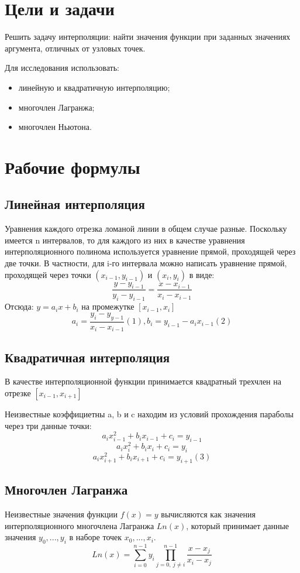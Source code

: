 \documentclass[12pt, a4paper]{article}
\begin{document}


\section*{Цели и задачи}
Решить задачу интерполяции: найти значения функции при заданных значениях
аргумента, отличных от узловых точек.

Для исследования использовать:
\begin{itemize}
  \item линейную и квадратичную интерполяцию;
  \item многочлен Лагранжа;
  \item многочлен Ньютона.
\end{itemize}

\section*{Рабочие формулы}
\subsection*{Линейная интерполяция}
Уравнения каждого отрезка ломаной линии в общем случае разные. Поскольку
имеется n интервалов, то для  каждого из них в качестве  уравнения
интерполяционного полинома используется уравнение прямой, проходящей через
две точки. В частности, для i-го интервала можно написать уравнение прямой,
проходящей через точки $(x_{i-1}, y_{i-1})$ и $(x_i, y_i)$ в виде:
\[\frac{y - y_{i-1}}{y_i - y_{i-1}} = \frac{x - x_{i-1}}{x_i - x_{i-1}}\]
Отсюда: $y = a_ix + b_i$ на промежутке $[x_{i-1}, x_i]$
$$a_i = \frac{y_i - y_{y-1}}{x_i - x_{i-1}} (1), b_i = y_{i-1} - a_ix_{i-1} (2)$$

\subsection*{Квадратичная интерполяция}
В качестве интерполяционной функции принимается квадратный трехчлен на отрезке
$[x_{i-1}, x_{i+1}]$

Неизвестные коэффициетны a, b и c находим из условий прохождения параболы
через три данные точки:
$$a_ix_{i-1}^2 + b_ix_{i-1} + c_i = y_{i-1}$$
$$a_ix_i^2 + b_ix_i + c_i = y_i$$
$$a_ix_{i+1}^2 + b_ix_{i+1} + c_i = y_{i+1} (3)$$

\subsection*{Многочлен Лагранжа}
Неизвестные значения функции $f(x) = y$ вычисляются как значения
интерполяционного многочлена Лагранжа $Ln(x)$, который принимает данные
значения $y_0, ..., y_i$ в наборе точек $x_0, ..., x_i$.
$$Ln(x) = \sum_{i=0}^{n-1} y_i \prod_{j=0,\ j\neq i}^{n-1} \frac{x - x_j}{x_i - x_j}$$
\end{document}
